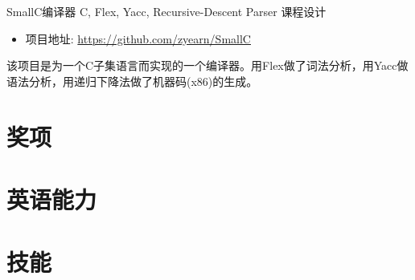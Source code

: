\documentclass[11pt,a4paper]{moderncv}
\begin{document}
{SmallC编译器}
{C, Flex, Yacc, Recursive-Descent Parser}
{课程设计}
{}
{
\begin{itemize}
    \item 项目地址: \url{https://github.com/zyearn/SmallC}
\end{itemize}
该项目是为一个C子集语言而实现的一个编译器。用Flex做了词法分析，用Yacc做语法分析，用递归下降法做了机器码(x86)的生成。\\
}



\section{奖项}

\section{英语能力}

\section{技能}


\end{document}
